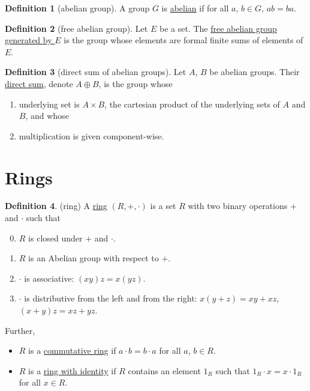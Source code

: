 \documentclass[a4paper]{report}
\newcommand{\defn}[1]{\ul{#1}}
\theoremstyle{definition}
\newtheorem{definition}{Definition}[section]
\theoremstyle{plain}
\theoremstyle{remark}
\begin{document}
\begin{definition}[abelian group]
  \label{def:abeliangroup}
  A group $G$ is \defn{abelian} if for all $a$, $b \in G$, $ab=ba$.
\end{definition}

\begin{definition}[free abelian group]
  \label{def:freeabeliangroup}
  Let $E$ be a set. The \defn{free abelian group generated by $E$} is the group whose elements are formal finite sums of elements of $E$.
\end{definition}

\begin{definition}[direct sum of abelian groups]
  \label{def:directsumofabeliangroup}
  Let $A$, $B$ be abelian groups. Their \defn{direct sum}, denote $A \oplus B$, is the group whose
  \begin{enumerate}
    \item underlying set is $A \times B$, the cartesian product of the underlying sets of $A$ and $B$, and whose

    \item multiplication is given component-wise.
  \end{enumerate}
\end{definition}
\section{Rings}

\begin{definition}(ring)
  \label{def:ring}
  A \defn{ring} $(R, +, \cdot )$ is a set $R$ with two binary operations $+$ and $\cdot $ such that
  \begin{enumerate}
      \setcounter{enumi}{-1}
    \item $R$ is closed under $+$ and $\cdot$.
    \item $R$ is an Abelian group with respect to $+$.
    \item $\cdot$ is associative: $(xy)z = x(yz)$.
    \item $\cdot$ is distributive from the left and from the right: $x(y+z) = xy + xz$, $(x+y)z = xz + yz$.
  \end{enumerate}

  Further,
  \begin{itemize}
    \item $R$ is a \defn{commutative ring} if $a\cdot b = b \cdot a$ for all $a$, $b \in R$.
    \item $R$ is a \defn{ring with identity} if $R$ contains an element $1_{R}$ such that $1_{R}\cdot  x = x\cdot 1_{R}$ for all $x \in R$.
  \end{itemize}
\end{definition}
\end{document}
